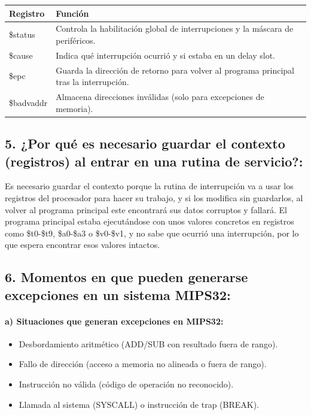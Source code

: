 \documentclass[12pt]{article}
\begin{document}
\begin{center}
\begin{tabular}{|p{3cm}|p{9cm}|}
\hline
\textbf{Registro} & \textbf{Función} \\ \hline
\$status & Controla la habilitación global de interrupciones y la máscara de periféricos. \\ \hline
\$cause & Indica qué interrupción ocurrió y si estaba en un delay slot. \\ \hline
\$epc & Guarda la dirección de retorno para volver al programa principal tras la interrupción. \\ \hline
\$badvaddr & Almacena direcciones inválidas (solo para excepciones de memoria). \\ \hline
\end{tabular}
\end{center}

\begin{center}
\subsection*{5. ¿Por qué es necesario guardar el contexto (registros) al entrar en una rutina de servicio?:}
\end{center}

Es necesario guardar el contexto porque la rutina de interrupción va a usar los registros del procesador para hacer su trabajo, y si los modifica sin guardarlos, al volver al programa principal este encontrará sus datos corruptos y fallará. El programa principal estaba ejecutándose con unos valores concretos en registros como \$t0-\$t9, \$a0-\$a3 o \$v0-\$v1, y no sabe que ocurrió una interrupción, por lo que espera encontrar esos valores intactos.

\vspace{0.5cm}

\begin{center}
\subsection*{6. Momentos en que pueden generarse excepciones en un sistema MIPS32:}
\end{center}

\paragraph*{a) Situaciones que generan excepciones en MIPS32:}

\begin{itemize}
    \item Desbordamiento aritmético (ADD/SUB con resultado fuera de rango).
    \item Fallo de dirección (acceso a memoria no alineada o fuera de rango).
    \item Instrucción no válida (código de operación no reconocido).
    \item Llamada al sistema (SYSCALL) o instrucción de trap (BREAK).
\end{itemize}
\end{document}
